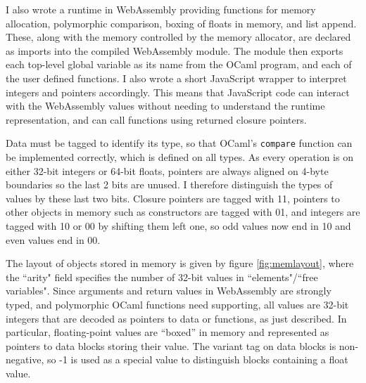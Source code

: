 I also wrote a runtime in WebAssembly providing functions for memory allocation, polymorphic comparison, boxing of floats in memory, and list append. These, along with the memory controlled by the memory allocator, are declared as imports into the compiled WebAssembly module. The module then exports each top-level global variable as its name from the OCaml program, and each of the user defined functions. 
I also wrote a short JavaScript wrapper to interpret integers and pointers accordingly. This means that JavaScript code can interact with the WebAssembly values without needing to understand the runtime representation, and can call functions using returned closure pointers.

Data must be tagged to identify its type, so that OCaml's \verb|compare| function can be implemented correctly, which is defined on all types. As every operation is on either 32-bit integers or 64-bit floats, pointers are always aligned on 4-byte boundaries so the last 2 bits are unused. I therefore distinguish the types of values by these last two bits. Closure pointers are tagged with 11, pointers to other objects in memory such as constructors are tagged with 01, and integers are tagged with 10 or 00 by shifting them left one, so odd values now end in 10 and even values end in 00. 

The layout of objects stored in memory is given by figure \ref{fig:memlayout}, where the ``arity" field specifies the number of 32-bit values in ``elements"/``free variables". Since arguments and return values in WebAssembly are strongly typed, and polymorphic OCaml functions need supporting, all values are 32-bit integers that are decoded as pointers to data or functions, as just described. In particular, floating-point values are ``boxed'' in memory and represented as pointers to data blocks storing their value. The variant tag on data blocks is non-negative, so -1 is used as a special value to distinguish blocks containing a float value.\\

